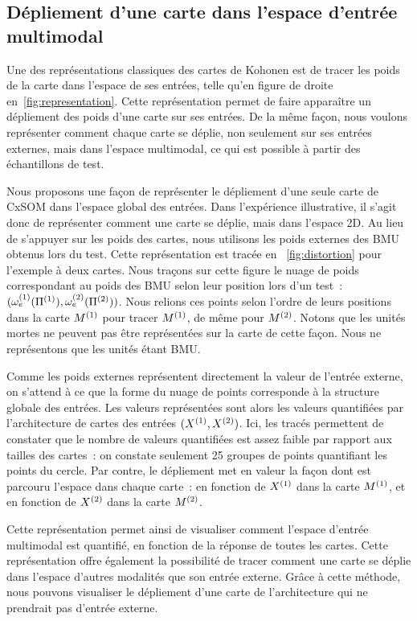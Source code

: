 \documentclass[../main]{subfiles}
\begin{document}
\subsection{Dépliement d'une carte dans l'espace d'entrée multimodal}

Une des représentations classiques des cartes de Kohonen est de tracer les poids de la carte dans l'espace de ses entrées, telle qu'en figure de droite en~\ref{fig:representation}. Cette représentation permet de faire apparaître un dépliement des poids d'une carte sur ses entrées.
De la même façon, nous voulons représenter comment chaque carte se déplie, non seulement sur ses entrées externes, mais dans l'espace multimodal, ce qui est possible à partir des échantillons de test.

Nous proposons une façon de représenter le dépliement d'une seule carte de CxSOM dans l'espace global des entrées. Dans l'expérience illustrative, il s'agit donc de représenter comment une carte se déplie, mais dans l'espace 2D.
Au lieu de s'appuyer sur les poids des cartes, nous utilisons les poids externes des BMU obtenus lors du test. Cette représentation est tracée en ~\ref{fig:distortion} pour l'exemple à deux cartes.
Nous traçons sur cette figure le nuage de poids correspondant au poids des BMU selon leur position lors d'un test~: $ (\omega_e^{({1})}(\Pi^{({1})}),\omega_e^{({2})}(\Pi^{({2})}))$. 
Nous relions ces points selon l'ordre de leurs positions dans la carte $M^{({1})}$ pour tracer $M^{({1})}$, de même pour $M^{({2})}$.  
Notons que les unités mortes ne peuvent pas être représentées sur la carte de cette façon. Nous ne représentons que les unités étant BMU. 

Comme les poids externes représentent directement la valeur de l'entrée externe, on s'attend à ce que la forme du nuage de points corresponde à la structure globale des entrées. Les valeurs représentées sont alors les valeurs quantifiées par l'architecture de cartes des entrées $(X^{({1})}, X^{({2})})$.
Ici, les tracés permettent de constater que le nombre de valeurs quantifiées est assez faible par rapport aux tailles des cartes~: on constate seulement 25 groupes de points quantifiant les points du cercle.
Par contre, le dépliement met en valeur la façon dont est parcouru l'espace dans chaque carte~: en fonction de $X^{({1})}$ dans la carte $M^{({1})}$, et en fonction de $X^{({2})}$ dans la carte $M^{({2})}$.

Cette représentation permet ainsi de visualiser comment l'espace d'entrée multimodal est quantifié, en fonction de la réponse de toutes les cartes.
Cette représentation offre également la possibilité de tracer comment une carte se déplie dans l'espace d'autres modalités que son entrée externe. 
Grâce à cette méthode, nous pouvons visualiser le dépliement d'une carte de l'architecture qui ne prendrait pas d'entrée externe.
\end{document}
